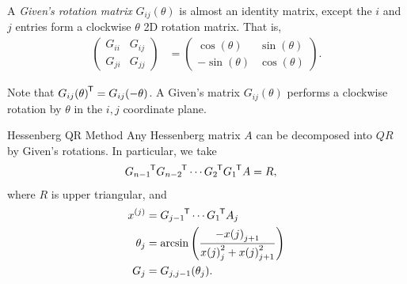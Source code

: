 \begin{defn}
    A \emph{Given's rotation matrix} $G_{ij}(\theta)$ is almost an identity matrix, except the $i$ and $j$ entries form a clockwise $\theta$ 2D rotation matrix. That is,
    \begin{align*}
        \begin{pmatrix}
            G_{ii} & G_{ij} \\ G_{ji} & G_{jj}
        \end{pmatrix} &= \begin{pmatrix}
            \cos(\theta) & \sin(\theta) \\ -\sin(\theta) & \cos(\theta)
        \end{pmatrix}.
    \end{align*}
\end{defn}

\begin{rmk}
    Note that ${G_{ij}(\theta)}^{\mkern-1.5mu\mathsf{T}} = G_{ij}(-\theta)$. A Given's matrix $G_{ij}(\theta)$ performs a clockwise rotation by $\theta$ in the $i,j$ coordinate plane.
\end{rmk}

\begin{thm}{Hessenberg QR Method}\proofbreak
    Any Hessenberg matrix $A$ can be decomposed into $QR$ by Given's rotations. In particular, we take
    \begin{align*}
        {G_{n-1}}^{\mkern-1.5mu\mathsf{T}}{G_{n-2}}^{\mkern-1.5mu\mathsf{T}}\cdots {G_{2}}^{\mkern-1.5mu\mathsf{T}}{G_{1}}^{\mkern-1.5mu\mathsf{T}}A &= R,
    \end{align*}
    where $R$ is upper triangular, and
    \begin{align*}
        x^{(j)} &= {G_{j-1}}^{\mkern-1.5mu\mathsf{T}}\cdots{G_{1}}^{\mkern-1.5mu\mathsf{T}}A_{j} \\
        \theta_j &= \arcsin\left(\frac{-x{(j)}_{j+1}}{x{(j)}_{j}^2+x{(j)}_{j+1}^2}\right)\\
        G_{j} &= G_{j,j-1}(\theta_j).
    \end{align*}
\end{thm}

